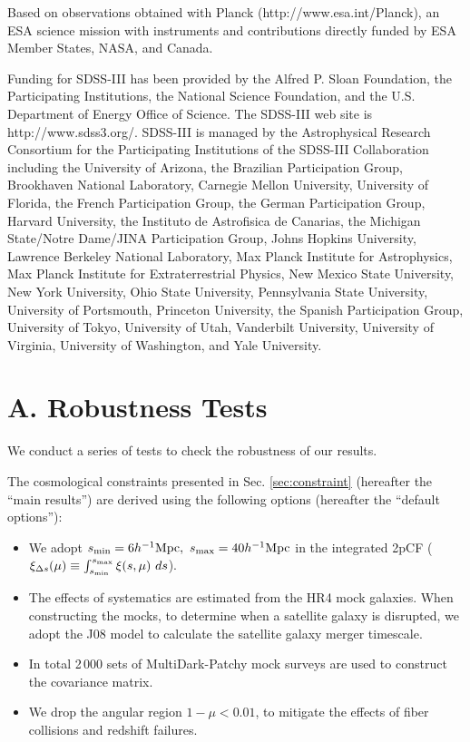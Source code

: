 \documentclass[iop]{emulateapj}
\begin{document}
Based on observations obtained with Planck (http://www.esa.int/Planck), 
an ESA science mission with instruments and contributions directly funded by 
ESA Member States, NASA, and Canada.

Funding for SDSS-III has been provided by the Alfred P. Sloan Foundation, the Participating Institutions, the
National Science Foundation, and the U.S. Department of Energy Office of Science. 
The SDSS-III web site is http://www.sdss3.org/. 
SDSS-III is managed by the Astrophysical Research Consortium for the Participating Institutions
of the SDSS-III Collaboration including the University of Arizona, the Brazilian Participation Group, Brookhaven
National Laboratory, Carnegie Mellon University, University of Florida, the French Participation Group, 
the German Participation Group, Harvard University, the Instituto de Astrofisica de Canarias, the Michigan State/Notre
Dame/JINA Participation Group, Johns Hopkins University, Lawrence Berkeley National Laboratory, Max Planck
Institute for Astrophysics, Max Planck Institute for Extraterrestrial Physics, New Mexico State University, New
York University, Ohio State University, Pennsylvania State
University, University of Portsmouth, Princeton University,
the Spanish Participation Group, University of Tokyo, University of Utah, Vanderbilt University, University of Virginia, 
University of Washington, and Yale University.


\appendix

\section{A. Robustness Tests}\label{sec:RBtest}

We conduct a series of tests to check the robustness of our results.

The cosmological constraints presented in Sec. \ref{sec:constraint} (hereafter the ``main results'') are derived using 
the following options (hereafter the ``default options''):
\begin{itemize}
 \item We adopt $s_{\rm min}=6 h^{-1} {\rm Mpc},\ s_{\rm max}=40 h^{-1} {\rm Mpc}$ in the integrated 2pCF
 ($\xi_{\Delta s} (\mu) \equiv \int_{s_{\rm min}}^{s_{\rm max}} \xi (s,\mu)\ ds$).
 \item The effects of systematics are estimated from the HR4 mock galaxies. 
 When constructing the mocks, to determine when a satellite galaxy is disrupted,
 we adopt the J08 model to calculate the satellite galaxy merger timescale.
 \item In total 2\,000 sets of MultiDark-Patchy mock surveys are used to construct the covariance matrix.
 \item We drop the angular region $1 - \mu < 0.01$, to mitigate the effects of fiber collisions and redshift failures.
\end{itemize}
\end{document}
